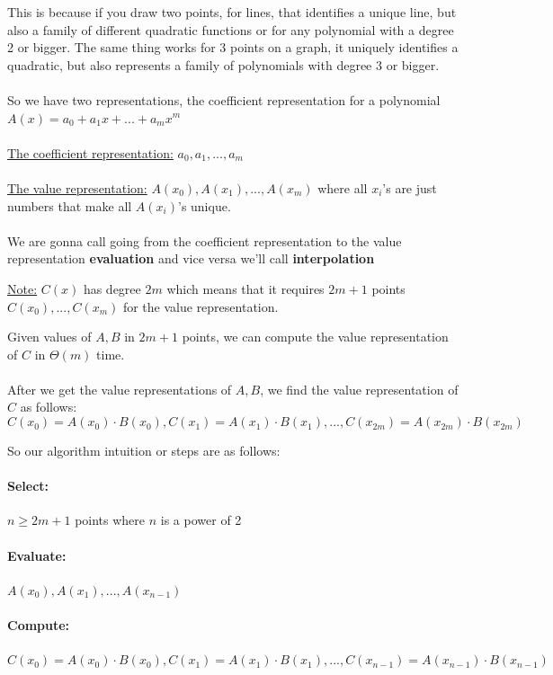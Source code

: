 \documentclass[12pt]{article}
\begin{document}
This is because if you draw two points, for lines, that identifies a unique line, but also a family of different quadratic functions or for any polynomial with a degree 2 or bigger. The same thing works for 3 points on a graph, it uniquely identifies a quadratic, but also represents a family of polynomials with degree 3 or bigger.\\
\\
So we have two representations, the coefficient representation for a polynomial $A(x) = a_0 + a_1 x + ... + a_m x^m$\\
\\
\underline{The coefficient representation:} $a_0, a_1, ... , a_m$\\
\\
\underline{The value representation:} $A(x_0), A(x_1), ... , A(x_m)$ where all $x_i$'s are just numbers that make all $A(x_i)$'s unique.\\
\\
We are gonna call going from the coefficient representation to the value representation \textbf{evaluation} and vice versa we'll call \textbf{interpolation}

\begin{tcolorbox}
	\underline{Note:} $C(x)$ has degree $2m$ which means that it requires $2m+1$ points $C(x_0), ..., C(x_m)$ for the value representation.
\end{tcolorbox}

Given values of $A,B$ in $2m+1$ points, we can compute the value representation of $C$ in $\Theta (m)$ time.\\
\\

After we get the value representations of $A,B$, we find the value representation of $C$ as follows:
$$C(x_0) = A(x_0) \cdot B(x_0), C(x_1) = A(x_1) \cdot B(x_1), ..., C(x_{2m}) = A(x_{2m}) \cdot B(x_{2m})$$

So our algorithm intuition or steps are as follows:
\paragraph{Select:} $n \geq 2m+1$ points where $n$ is a power of 2
\paragraph{Evaluate:} $A(x_0), A(x_1), ... , A(x_{n-1})$
\paragraph{Compute:} $C(x_0) = A(x_0) \cdot B(x_0), C(x_1) = A(x_1) \cdot B(x_1), ..., C(x_{n-1}) = A(x_{n-1}) \cdot B(x_{n-1})$
\end{document}
